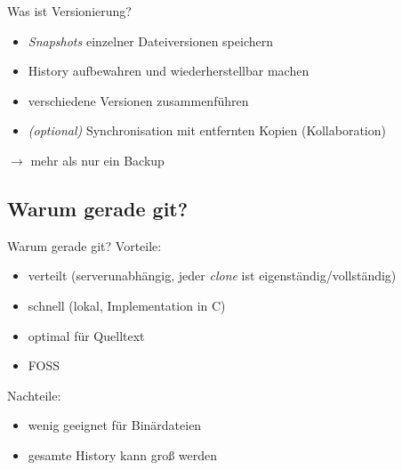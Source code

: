 \begin{frame}{Was ist Versionierung?}
    \begin{itemize}
        \item \emph{Snapshots} einzelner Dateiversionen speichern
        \item History aufbewahren und wiederherstellbar machen
        \item verschiedene Versionen zusammenführen
        \item \emph{(optional)} Synchronisation mit entfernten Kopien (Kollaboration)
    \end{itemize}
    $\rightarrow$ mehr als nur ein Backup
\end{frame}

\subsection{Warum gerade git?}
\begin{frame}{Warum gerade git?}
    Vorteile:
    \begin{itemize}
        \item verteilt (serverunabhängig, jeder \emph{clone} ist eigenständig/vollständig)
        \item schnell (lokal, Implementation in C)
        \item optimal für Quelltext
        \item FOSS
    \end{itemize}

    Nachteile:
    \begin{itemize}
        \item wenig geeignet für Binärdateien
        \item gesamte History kann groß werden
    \end{itemize}
\end{frame}
